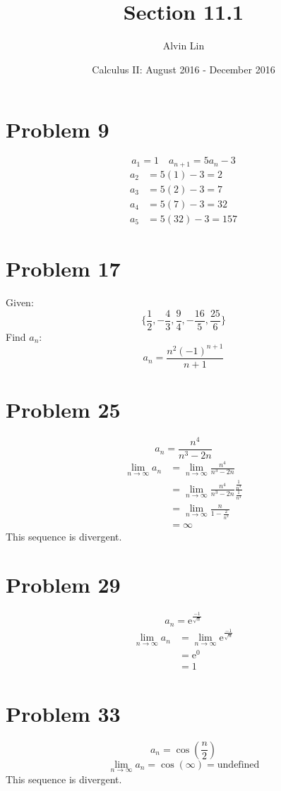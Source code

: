 \documentclass[letterpaper, 12pt]{article}
\title{Section 11.1}
\author{Alvin Lin}
\date{Calculus II: August 2016 - December 2016}
\newcommand*{\e}{\mathrm{e}}
\begin{document}
\maketitle

\section*{Problem 9}
\[ a_{1} = 1 \quad a_{n+1} = 5a_{n}-3 \]
\begin{align*}
  a_{2} &= 5(1)-3 = 2 \\
  a_{3} &= 5(2)-3 = 7 \\
  a_{4} &= 5(7)-3 = 32 \\
  a_{5} &= 5(32)-3 = 157
\end{align*}

\section*{Problem 17}
Given:
\[ \bigg\{\frac{1}{2},-\frac{4}{3},
   \frac{9}{4},-\frac{16}{5},\frac{25}{6}\bigg\} \]
Find \( a_{n} \):
\[ a_{n} = \frac{n^{2}(-1)^{n+1}}{n+1} \]

\section*{Problem 25}
\[ a_{n} = \frac{n^{4}}{n^{3}-2n} \]
\begin{align*}
  \lim_{n\to\infty}{a_{n}} &= \lim_{n\to\infty}{\frac{n^{4}}{n^{3}-2n}} \\
  &= \lim_{n\to\infty}{\frac{n^{4}}{n^{3}-2n}
    \frac{\frac{1}{n^{3}}}{\frac{1}{n^{3}}}} \\
  &= \lim_{n\to\infty}{\frac{n}{1-\frac{2}{n^{2}}}} \\
  &= \infty
\end{align*}
This sequence is divergent.

\section*{Problem 29}
\[ a_{n} = \e^{\frac{-1}{\sqrt{n}}} \]
\begin{align*}
  \lim_{n\to\infty}{a_{n}} &= \lim_{n\to\infty}{\e^{\frac{-1}{\sqrt{n}}}} \\
  &= \e^{0} \\
  &= 1
\end{align*}

\section*{Problem 33}
\[ a_{n} = \cos(\frac{n}{2}) \]
\[ \lim_{n\to\infty}{a_{n}} = \cos(\infty) = \mathrm{undefined} \]
This sequence is divergent.
\end{document}
